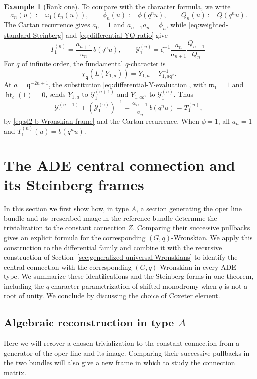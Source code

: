 \documentclass[11pt,leqno]{amsart}
\numberwithin{equation}{section}
\theoremstyle{plain}
\theoremstyle{definition}
\theoremstyle{plain}
\theoremstyle{definition}
\newtheorem{example}[theorem]{Example}
\theoremstyle{remark}
\newcommand{\qaff}{\mathsf q}
\begin{document}
\begin{example}[Rank one]
To compare with the character formula, we write
\[
 a_n(u):=\omega_1(t_n(u)),\qquad
 \phi_n(u):=\phi(q^nu),\qquad Q_n(u):=Q(q^nu).
\]
The Cartan recurrence gives $a_0=1$ and $a_{n+1}a_n=\phi_n$, while \eqref{eq:weighted-standard-Steinberg} and \eqref{eq:differential-YQ-ratio} give
\[
 T_1^{(n)}=\frac{a_{n+1}}{a_n}\,b(q^nu),\qquad
 \mathcal Y_1^{(n)}
   =\zeta^{-1}\frac{a_n}{a_{n+1}}\frac{Q_{n+1}}{Q_n}.
\]
For $q$ of infinite order, the fundamental $q$-character is
\[
 \chi_{\qaff}(L(Y_{1,a}))=Y_{1,a}+Y_{1,a\qaff^2}^{-1}.
\]
At $a=\qaff^{-2n+1}$, the substitution \eqref{eq:differential-Y-evaluation}, with $\mathfrak m_1=1$ and $\operatorname{ht}_c(1)=0$, sends $Y_{1,a}$ to $\mathcal Y_1^{(n+1)}$ and $Y_{1,a\qaff^2}$ to $\mathcal Y_1^{(n)}$.  Thus
\[
 \mathcal Y_1^{(n+1)}+(\mathcal Y_1^{(n)})^{-1}
 =\frac{a_{n+1}}{a_n}\,b(q^nu)=T_1^{(n)},
\]
by \eqref{eq:sl2-b-Wronskian-frame} and the Cartan recurrence.  When $\phi=1$, all $a_n=1$ and $T_1^{(n)}(u)=b(q^nu)$.
\end{example}

\section{The ADE central connection and its Steinberg frames}\label{sec:ADE-central-connection}
In this section we first show how, in type $A$, a section generating the oper line bundle and its prescribed image in the reference bundle determine the trivialization to the constant connection $Z$.  Comparing their successive pullbacks gives an explicit formula for the corresponding $(G,q)$-Wronskian.  We apply this construction to the differential family and combine it with the recursive construction of Section~\ref{sec:generalized-universal-Wronskians} to identify the central connection with the corresponding $(G,q)$-Wronskian in every ADE type.  We summarize these identifications and the Steinberg forms in one theorem, including the $q$-character parametrization of shifted monodromy when $q$ is not a root of unity.  We conclude by discussing the choice of Coxeter element.

\subsection{Algebraic reconstruction in type \texorpdfstring{$A$}{A}}\label{sec:typeA-direct}
Here we will recover a chosen trivialization to the constant connection from a generator of the oper line and its image. Comparing their successive pullbacks in the two bundles will also give a new frame in which to study the connection matrix.
\end{document}
